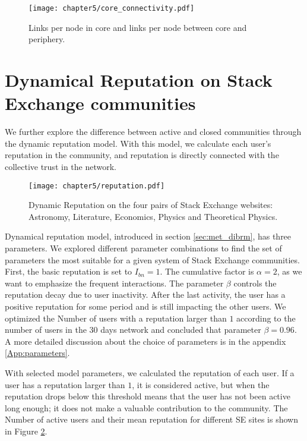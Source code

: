 \begin{figure}[h]
	\centering
	\texttt{[image: chapter5/core\_connectivity.pdf]}
	\caption{Links per node in core and links per node between core and periphery.}
	\label{fig:links_per_node}
\end{figure}

\section{Dynamical Reputation on Stack Exchange communities}

We further explore the difference between active and closed communities through the dynamic reputation model. With this model, we calculate each user's reputation in the community, and reputation is directly connected with the collective trust in the network. 

\begin{figure}[h]
	\centering
	\texttt{[image: chapter5/reputation.pdf]}
	\caption[Dynamic Reputation of Stack Exchange websites.]{Dynamic Reputation on the four pairs of Stack Exchange websites: Astronomy, Literature, Economics,  Physics and Theoretical Physics.}
	\label{fig:dr6panel}
\end{figure}

Dynamical reputation model, introduced in section \ref{sec:met_dibrm}, has three parameters. We explored different parameter combinations to find the set of parameters the most suitable for a given system of Stack Exchange communities. First, the basic reputation is set to $I_{bn}=1$. The cumulative factor is $\alpha=2$, as we want to emphasize the frequent interactions. The parameter $\beta$ controls the reputation decay due to user inactivity. After the last activity, the user has a positive reputation for some period and is still impacting the other users. We optimized the Number of users with a reputation larger than $1$ according to the number of users in the 30 days network and concluded that parameter $\beta=0.96$. A more detailed discussion about the choice of parameters is in the appendix \ref{App:parameters}. 

With selected model parameters, we calculated the reputation of each user. If a user has a reputation larger than $1$, it is considered active, but when the reputation drops below this threshold means that the user has not been active long enough; it does not make a valuable contribution to the community. The Number of active users and their mean reputation for different SE sites is shown in Figure \ref{fig:dr6panel}. 

